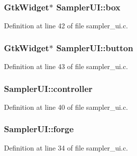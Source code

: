 \subsubsection[{\texorpdfstring{box}{box}}]{\setlength{\rightskip}{0pt plus 5cm}Gtk\+Widget$\ast$ Sampler\+U\+I\+::box}\hypertarget{struct_sampler_u_i_ad2d708c40329570e1a20136257bec213}{}\label{struct_sampler_u_i_ad2d708c40329570e1a20136257bec213}


Definition at line 42 of file sampler\+\_\+ui.\+c.

\subsubsection[{\texorpdfstring{button}{button}}]{\setlength{\rightskip}{0pt plus 5cm}Gtk\+Widget$\ast$ Sampler\+U\+I\+::button}\hypertarget{struct_sampler_u_i_a883cc0ffab4c838befebc788b6cfd5ba}{}\label{struct_sampler_u_i_a883cc0ffab4c838befebc788b6cfd5ba}


Definition at line 43 of file sampler\+\_\+ui.\+c.

\subsubsection[{\texorpdfstring{controller}{controller}}]{ Sampler\+U\+I\+::controller}\hypertarget{struct_sampler_u_i_af020d8961fb4a38099d38d42eadd1a9c}{}\label{struct_sampler_u_i_af020d8961fb4a38099d38d42eadd1a9c}


Definition at line 40 of file sampler\+\_\+ui.\+c.

\subsubsection[{\texorpdfstring{forge}{forge}}]{ Sampler\+U\+I\+::forge}\hypertarget{struct_sampler_u_i_a70537477cd7f3d568ea0df161138e7e0}{}\label{struct_sampler_u_i_a70537477cd7f3d568ea0df161138e7e0}


Definition at line 34 of file sampler\+\_\+ui.\+c.

